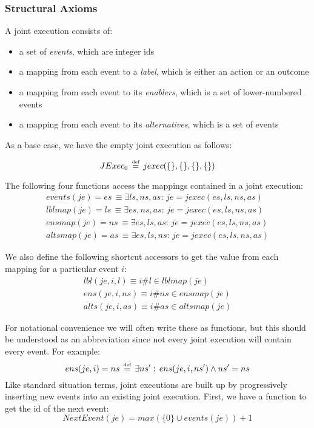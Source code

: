 \subsubsection{Structural Axioms}

A joint execution consists of:

\begin{itemize}
\item a set of \emph{events}, which are integer ids 
\item a mapping from each event to a \emph{label}, which is either an action
or an outcome 
\item a mapping from each event to its \emph{enablers}, which is a set of
lower-numbered events 
\item a mapping from each event to its \emph{alternatives}, which is a set
of events 
\end{itemize}
As a base case, we have the empty joint execution as follows:

\[
JExec_{0}\,\stackrel{\mbox{\tiny def}}{=}\, jexec(\{\},\{\},\{\},\{\})\]


The following four functions access the mappings contained in a joint
execution:\begin{gather*}
events(je)=es\,\equiv\exists ls,ns,as:\, je=jexec(es,ls,ns,as)\\
lblmap(je)=ls\,\equiv\exists es,ns,as:\, je=jexec(es,ls,ns,as)\\
ensmap(je)=ns\,\equiv\exists es,ls,as:\, je=jexec(es,ls,ns,as)\\
altsmap(je)=as\,\equiv\exists es,ls,ns:\, je=jexec(es,ls,ns,as)\end{gather*}


We also define the following shortcut accessors to get the value from
each mapping for a particular event $i$:\begin{gather*}
lbl(je,i,l)\equiv i\#l\in lblmap(je)\\
ens(je,i,ns)\equiv i\#ns\in ensmap(je)\\
alts(je,i,as)\equiv i\#as\in altsmap(je)\end{gather*}


For notational convenience we will often write these as functions,
but this should be understood as an abbreviation since not every joint
execution will contain every event. For example:\[
ens(je,i)=ns\,\stackrel{\mbox{\tiny def}}{=}\,\exists ns':\, ens(je,i,ns')\wedge ns'=ns\]
 Like standard situation terms, joint executions are built up by progressively
inserting new events into an existing joint execution. First, we have
a function to get the id of the next event:\[
NextEvent(je)=max(\{0\}\cup events(je))+1\]


